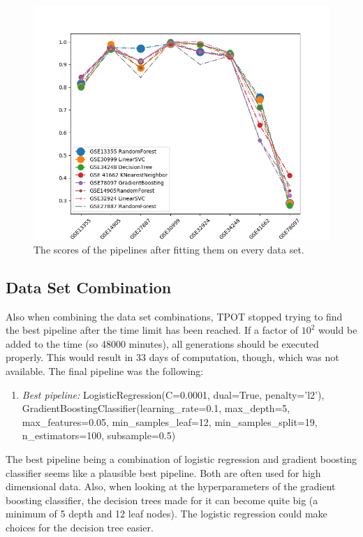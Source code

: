 \documentclass[10pt,a4paper]{article}
\begin{document}
	\begin{figure}[h!]
		\includegraphics[scale=0.6]{DataPipelineScores.png}
		\caption{The scores of the pipelines after fitting them on every data set.}
		\label{fig:DataPipelineScores}
	\end{figure}

	\subsection{Data Set Combination}
	\label{subsec:ResultsDataSetCombination}
	
	Also when combining the data set combinations, TPOT stopped trying to find the best pipeline after the time limit has been reached. If a factor of $10^2$ would be added to the time (so 48000 minutes), all generations should be executed properly. This would result in 33 days of computation, though, which was not available. The final pipeline was the following:
	
	\begin{enumerate}
		\item[] \textit{Best pipeline:}  LogisticRegression(C=0.0001, dual=True, penalty='l2'),
		GradientBoostingClassifier(learning\_rate=0.1, max\_depth=5, max\_features=0.05,
		min\_samples\_leaf=12,
		min\_samples\_split=19, n\_estimators=100, subsample=0.5)
		
	\end{enumerate}

	The best pipeline being a combination of logistic regression and gradient boosting classifier seems like a plausible best pipeline. Both are often used for high dimensional data. Also, when looking at the hyperparameters of the gradient boosting classifier, the decision trees made for it can become quite big (a minimum of 5 depth and 12 leaf nodes). The logistic regression could make choices for the decision tree easier.
	
\end{document}
